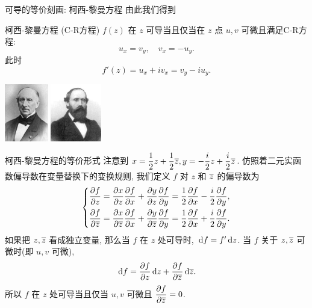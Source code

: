 \begin{frame}{可导的等价刻画: 柯西-黎曼方程}
	\onslide<+->
	由此我们得到
	\onslide<+->
	\begin{alertblock}{柯西-黎曼方程 (C-R方程)}
		$f(z)$ 在 $z$ 可导当且仅当在 $z$ 点 $u,v$ 可微且满足C-R方程:
		\[u_x=v_y,\quad v_x=-u_y.\]
		此时
		\[f'(z)=u_x+iv_x=v_y-iu_y.\]
	\end{alertblock}

	\onslide<+->
	\begin{center}
		\includegraphics[height=25mm]{../image/Cauchy.jpeg}
		\hspace{2cm}
		\includegraphics[height=25mm]{../image/Riemann.jpeg}
	\end{center}
\end{frame}


\begin{frame}{柯西-黎曼方程的等价形式\noexer}
	\onslide<+->
	注意到 $x=\dfrac12z+\dfrac12\overline z,y=-\dfrac i2z+\dfrac i2\overline z$.
	\onslide<+->
	仿照着二元实函数偏导数在变量替换下的变换规则, 我们定义 $f$ 对 $z$ 和 $\overline z$ 的偏导数为
	\[\left\{
	\begin{aligned}
		\frac{\partial f}{\partial z}&
	=\frac{\partial x}{\partial z}\frac{\partial f}{\partial x}
		+\frac{\partial y}{\partial z}\frac{\partial f}{\partial y}
	=\frac12\frac{\partial f}{\partial x}-\frac i2\frac{\partial f}{\partial y},\\
		\frac{\partial f}{\partial \overline z}&
	=\frac{\partial x}{\partial \overline z}\frac{\partial f}{\partial x}
		+\frac{\partial y}{\partial \overline z}\frac{\partial f}{\partial y}
	=\frac12\frac{\partial f}{\partial x}+\frac i2\frac{\partial f}{\partial y}.
	\end{aligned}\right.\]
	\onslide<+->
	如果把 $z,\overline z$ 看成独立变量, 那么当 $f$ 在 $z$ 处可导时,
	$\,\mathrm{d} f=f'\,\mathrm{d} z$.
	当 $f$ 关于 $z,\overline z$ 可微时(即 $u,v$ 可微),
	\[\,\mathrm{d} f=\frac{\partial f}{\partial z}\,\mathrm{d} z+\frac{\partial f}{\partial \overline z}\,\mathrm{d}\overline z.\]
	\onslide<+->
	所以 \alert{$f$ 在 $z$ 处可导当且仅当 $u,v$ 可微且 $\dfrac{\partial f}{\partial \overline z}=0$.}
\end{frame}


